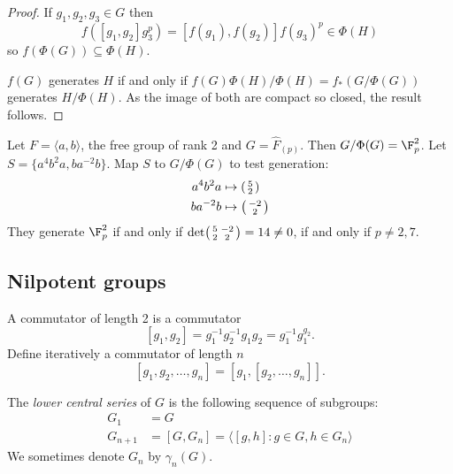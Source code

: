 \documentclass[a4paper]{article}
\begin{document}
\begin{proof}
  If \(g_1, g_2, g_3 \in G\) then
  \[
    f([g_1, g_2] g_3^p) = [f(g_1), f(g_2)] f(g_3)^p \in \Phi(H)
  \]
  so \(f(\Phi(G)) \subseteq \Phi(H)\).

  \(f(G)\) generates \(H\) if and only if \(f(G) \Phi(H)/\Phi(H) = f_*(G/\Phi(G))\) generates \(H/\Phi(H)\). As the image of both are compact so closed, the result follows.
\end{proof}

\begin{eg}
  Let \(F = \langle a, b\rangle\), the free group of rank 2 and \(G = \hat F_{(p)}\). Then \(G/\Phi(G) = \F_p^2\). Let \(S = \{a^4b^2a, ba^{-2}b\}\). Map \(S\) to \(G/\Phi(G)\) to test generation:
  \begin{align*}
    a^4b^2a &\mapsto
              \begin{psmallmatrix}
                5 \\
                2
              \end{psmallmatrix}
    \\
    ba^{-2}b &\mapsto
               \begin{psmallmatrix}
                 -2 \\
                 2
               \end{psmallmatrix}
  \end{align*}
  They generate \(\F_p^2\) if and only if \(\det
  \begin{psmallmatrix}
    5 & -2 \\
    2 & 2
  \end{psmallmatrix}
  = 14 \ne 0\), if and only if \(p \ne 2, 7\).
\end{eg}

\subsection{Nilpotent groups}

\begin{definition}
  A commutator of length 2 is a commutator
  \[
    [g_1, g_2] = g_1^{-1}g_2^{-1}g_1g_2 = g_1^{-1}g_1^{g_2}.
  \]
  Define iteratively a commutator of length \(n\)
  \[
    [g_1, g_2, \dots, g_n] = [g_1, [g_2, \dots, g_n]].
  \]
\end{definition}

\begin{definition}
  The \emph{lower central series} of \(G\) is the following sequence of subgroups:
  \begin{align*}
    G_1 &= G \\
    G_{n + 1} &= [G, G_n] = \langle [g, h]: g \in G, h \in G_n \rangle
  \end{align*}
  We sometimes denote \(G_n\) by \(\gamma_n(G)\).
\end{definition}
\end{document}
